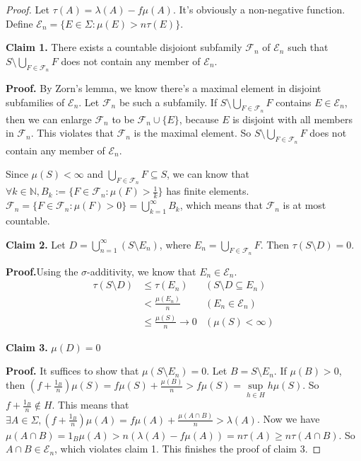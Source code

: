\documentclass[a4paper, linespread=1.5]{article}
\newcommand\ee{\mathcal{E}}
\newcommand\ff{\mathcal{F}}
\begin{document}
\begin{proof}
        Let $\tau(A)=\lambda(A)-f\mu(A)$.
        It's obviously a non-negative function.
        Define $\ee_n=\{E\in\Sigma:\mu(E)>n\tau(E)\}$.

        \textbf{Claim 1.} There exists a countable disjoiont subfamily $\ff_n$ of $\ee_n$ 
        such that $S\setminus \bigcup\limits_{F\in \ff_n} F$ does not contain any member of $\ee_n$.

        \textbf{Proof.} By Zorn's lemma, we know there's a maximal element in disjoint subfamilies of $\ee_n$.
        Let $\ff_n$ be such a subfamily.
        If $S\setminus\bigcup\limits_{F\in \ff_n}F$ contains $E \in\ee_n$,
         then we can enlarge $\ff_n$ to be $\ff_n \cup \{E\}$,
        because $E$ is disjoint with all members in $\ff_n$.
        This violates that $\ff_n$ is the maximal element.
        So $S\setminus \bigcup\limits_{F\in \ff_n}F$ does not contain any member of $\ee_n$.

        Since $\mu(S)<\infty$ and $\bigcup\limits_{F\in \ff_n}F \subseteq S$, 
        we can know that $\forall k\in\mathbb{N} ,B_k:=\{F\in \ff_n:\mu(F)>\frac{1}{k}\}$ has finite elements.
        $\ff_n=\{F\in \ff_n:\mu(F)>0\}=\bigcup_{k=1}^{\infty}B_k$, which means that $\ff_n$ is at most countable.

        \textbf{Claim 2.} Let $D=\bigcup\limits_{n=1}^{\infty}(S\setminus E_n)$, 
        where $E_n=\bigcup\limits_{F\in \ff_n}F$.
        Then  $\tau(S\setminus D)=0$.

        \textbf{Proof.}Using the $\sigma$-additivity, we know that $E_n\in\ee_n$.
        \begin{align*}
            \tau(S\setminus D)&\le \tau(E_n)   &(S\setminus D\subseteq E_n)\\
                              &<\frac{\mu(E_n)}{n} &(E_n\in\ee_n)\\
                              &\le \frac{\mu(S)}{n}\to 0&(\mu(S)<\infty)
        \end{align*}

        \textbf{Claim 3.} $\mu(D)=0$

        \textbf{Proof.} It suffices to show that $\mu(S\setminus E_n)=0$.
        Let $B=S\setminus E_n$.
        If $\mu(B)>0$, then $(f+\frac{1_B}{n})\mu(S)=f\mu(S)+\frac{\mu(B)}{n}>f\mu(S)=\sup\limits_{h\in H} h\mu(S)$.
        So $f+\frac{1_B}{n}\notin H$.
        This means that $\exists A\in\Sigma,(f+\frac{1_B}{n})\mu(A)=f\mu(A)+\frac{\mu(A\cap B)}{n}>\lambda(A) $.
        Now we have $\mu(A\cap B) = 1_{B}\mu(A) > n(\lambda(A)-f\mu(A))=n\tau(A)\ge n\tau(A\cap B)$.
        So $A\cap B\in\ee_n$, which violates claim 1.
        This finishes the proof of claim 3.


\end{proof}
\end{document}
